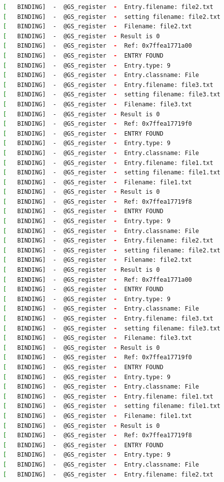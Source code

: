 \begin{lstlisting}[language=bash]
[   BINDING]  -  @GS_register  -  Entry.filename: file2.txt
[   BINDING]  -  @GS_register  -  setting filename: file2.txt
[   BINDING]  -  @GS_register  -  Filename: file2.txt
[   BINDING]  -  @GS_register  - Result is 0
[   BINDING]  -  @GS_register  -  Ref: 0x7ffea1771a00
[   BINDING]  -  @GS_register  -  ENTRY FOUND
[   BINDING]  -  @GS_register  -  Entry.type: 9
[   BINDING]  -  @GS_register  -  Entry.classname: File
[   BINDING]  -  @GS_register  -  Entry.filename: file3.txt
[   BINDING]  -  @GS_register  -  setting filename: file3.txt
[   BINDING]  -  @GS_register  -  Filename: file3.txt
[   BINDING]  -  @GS_register  - Result is 0
[   BINDING]  -  @GS_register  -  Ref: 0x7ffea17719f0
[   BINDING]  -  @GS_register  -  ENTRY FOUND
[   BINDING]  -  @GS_register  -  Entry.type: 9
[   BINDING]  -  @GS_register  -  Entry.classname: File
[   BINDING]  -  @GS_register  -  Entry.filename: file1.txt
[   BINDING]  -  @GS_register  -  setting filename: file1.txt
[   BINDING]  -  @GS_register  -  Filename: file1.txt
[   BINDING]  -  @GS_register  - Result is 0
[   BINDING]  -  @GS_register  -  Ref: 0x7ffea17719f8
[   BINDING]  -  @GS_register  -  ENTRY FOUND
[   BINDING]  -  @GS_register  -  Entry.type: 9
[   BINDING]  -  @GS_register  -  Entry.classname: File
[   BINDING]  -  @GS_register  -  Entry.filename: file2.txt
[   BINDING]  -  @GS_register  -  setting filename: file2.txt
[   BINDING]  -  @GS_register  -  Filename: file2.txt
[   BINDING]  -  @GS_register  - Result is 0
[   BINDING]  -  @GS_register  -  Ref: 0x7ffea1771a00
[   BINDING]  -  @GS_register  -  ENTRY FOUND
[   BINDING]  -  @GS_register  -  Entry.type: 9
[   BINDING]  -  @GS_register  -  Entry.classname: File
[   BINDING]  -  @GS_register  -  Entry.filename: file3.txt
[   BINDING]  -  @GS_register  -  setting filename: file3.txt
[   BINDING]  -  @GS_register  -  Filename: file3.txt
[   BINDING]  -  @GS_register  - Result is 0
[   BINDING]  -  @GS_register  -  Ref: 0x7ffea17719f0
[   BINDING]  -  @GS_register  -  ENTRY FOUND
[   BINDING]  -  @GS_register  -  Entry.type: 9
[   BINDING]  -  @GS_register  -  Entry.classname: File
[   BINDING]  -  @GS_register  -  Entry.filename: file1.txt
[   BINDING]  -  @GS_register  -  setting filename: file1.txt
[   BINDING]  -  @GS_register  -  Filename: file1.txt
[   BINDING]  -  @GS_register  - Result is 0
[   BINDING]  -  @GS_register  -  Ref: 0x7ffea17719f8
[   BINDING]  -  @GS_register  -  ENTRY FOUND
[   BINDING]  -  @GS_register  -  Entry.type: 9
[   BINDING]  -  @GS_register  -  Entry.classname: File
[   BINDING]  -  @GS_register  -  Entry.filename: file2.txt

\end{lstlisting}
